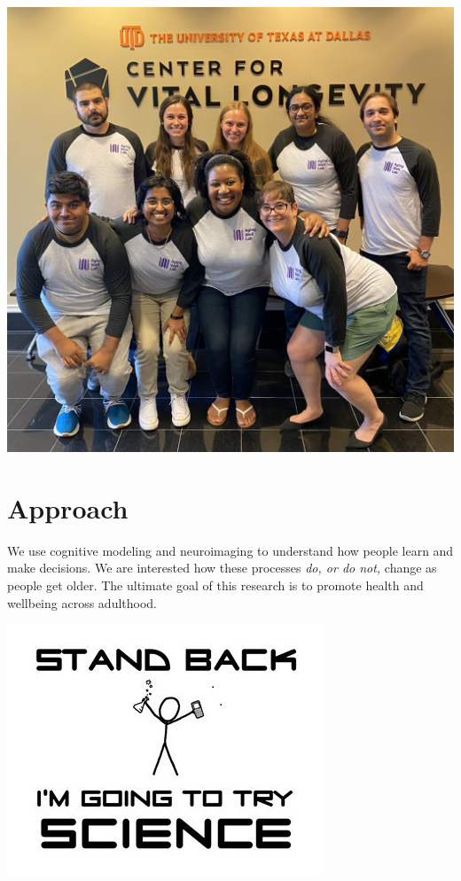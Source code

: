 \documentclass[]{book}
\begin{document}
\includegraphics[width=1\textwidth,height=\textheight]{images/Lab_photo_Summer2021.jpg}

\hypertarget{approach}{%
\chapter{Approach}\label{approach}}

We use cognitive modeling and neuroimaging to understand how people learn and make decisions. We are interested how these processes \emph{do, or do not,} change as people get older. The ultimate goal of this research is to promote health and wellbeing across adulthood.

\includegraphics{images/xkcd_science.png}
\end{document}

